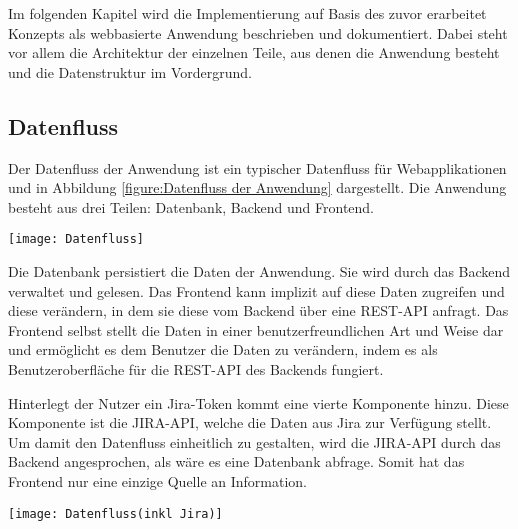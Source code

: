 
Im folgenden Kapitel wird die Implementierung auf Basis des zuvor erarbeitet Konzepts als webbasierte Anwendung beschrieben und dokumentiert. Dabei steht vor allem die Architektur der einzelnen Teile, aus denen die Anwendung besteht und die Datenstruktur im Vordergrund.

\subsection{Datenfluss}
Der Datenfluss der Anwendung ist ein typischer Datenfluss für Webapplikationen und in Abbildung \ref{figure:Datenfluss der Anwendung} dargestellt. Die Anwendung besteht aus drei Teilen: Datenbank, Backend und Frontend.

\vspace{20pt}
\begin{center}
    \begin{minipage}{1\linewidth}
        \texttt{[image: Datenfluss]}
        \label{figure:Datenfluss der Anwendung}
    \end{minipage}
\end{center}
\vspace{20pt}

Die Datenbank persistiert die Daten der Anwendung. Sie wird durch das Backend verwaltet und gelesen. Das Frontend kann implizit auf diese Daten zugreifen und diese verändern, in dem sie diese vom Backend über eine REST-API anfragt. Das Frontend selbst stellt die Daten in einer benutzerfreundlichen Art und Weise dar und ermöglicht es dem Benutzer die Daten zu verändern, indem es als Benutzeroberfläche für die REST-API des Backends fungiert.

Hinterlegt der Nutzer ein Jira-Token kommt eine vierte Komponente hinzu. Diese Komponente ist die JIRA-API, welche die Daten aus Jira zur Verfügung stellt. Um damit den Datenfluss einheitlich zu gestalten, wird die JIRA-API durch das Backend angesprochen, als wäre es eine Datenbank abfrage. Somit hat das Frontend nur eine einzige Quelle an Information.

\vspace{20pt}
\begin{center}
    \begin{minipage}{1\linewidth}
        \texttt{[image: Datenfluss(inkl Jira)]}
    \end{minipage}
\end{center}
\vspace{20pt}


